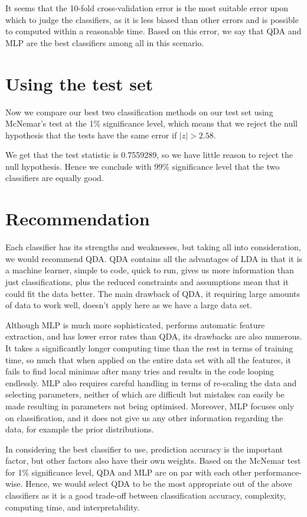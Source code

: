 \documentclass[11pt, a4paper]{article}
\begin{document}
It seems that the 10-fold cross-validation error is the most suitable error upon which to judge the classifiers, as it is less biased than other errors and is possible to computed within a reasonable time. Based on this error, we say that QDA and MLP are the best classifiers among all in this scenario.

\section{Using the test set}
Now we compare our best two classification methods on our test set using McNemar's test at the 1\% significance level, which means that we reject the null hypothesis that the tests have the same error if $|z| > 2.58$. 

We get that the test statistic is 0.7559289, so we have little reason to reject the null hypothesis. Hence we conclude with 99\% significance level that the two classifiers are equally good.

\section{Recommendation}

Each classifier has its strengths and weaknesses, but taking all into consideration, we would recommend QDA. QDA contains all the advantages of LDA in that it is a machine learner, simple to code, quick to run, gives us more information than just classifications, plus the reduced constraints and assumptions mean that it could fit the data better. The main drawback of QDA, it requiring large amounts of data to work well, doesn't apply here as we have a large data set.

Although MLP is much more sophisticated, performs automatic feature extraction, and has lower error rates than QDA, its drawbacks are also numerous. It takes a significantly longer computing time than the rest in terms of training time, so much that when applied on the entire data set with all the features, it fails to find local minimas after many tries and results in the code looping endlessly. MLP also requires careful handling in terms of re-scaling the data and selecting parameters, neither of which are difficult but mistakes can easily be made resulting in parameters not being optimised. Moreover, MLP focuses only on classification, and it does not give us any other information regarding the data, for example the prior distributions. 

In considering the best classifier to use, prediction accuracy is the important factor, but other factors also have their own weights. Based on the McNemar test for 1\% significance level, QDA and MLP are on par with each other performance-wise. Hence, we would select QDA to be the most appropriate out of the above classifiers as it is a good trade-off between classification accuracy, complexity, computing time, and interpretability.
\end{document}
